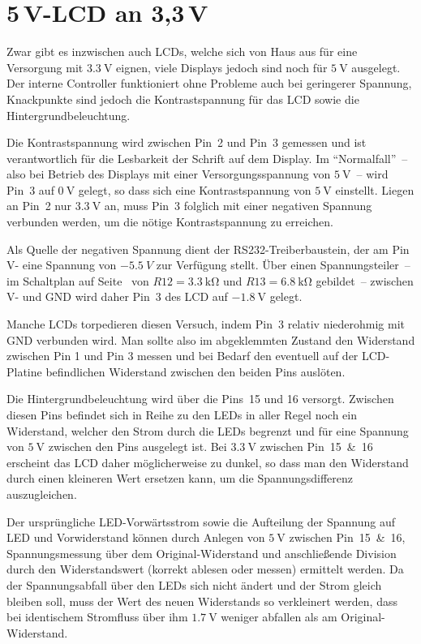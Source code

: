 \documentclass[paper=a4, parskip, numbers=noenddot, toc=listof, headsepline]{scrbook}
\begin{document}
		 \section[5V-LCD an 3,3V]{5\,V-LCD an 3,3\,V}

		  Zwar gibt es inzwischen auch LCDs, welche sich von Haus aus für eine Versorgung mit $\SI{3,3}{\volt}$ eignen, viele Displays jedoch sind noch für $\SI{5}{\volt}$ ausgelegt. Der interne Controller funktioniert ohne Probleme auch bei geringerer Spannung, Knackpunkte sind jedoch die Kontrastspannung für das LCD sowie die Hintergrundbeleuchtung.

		  Die Kontrastspannung wird zwischen Pin~2 und Pin~3 gemessen und ist verantwortlich für die Lesbarkeit der Schrift auf dem Display. Im \enquote{Normalfall}~-- also bei Betrieb des Displays mit einer Versorgungsspannung von $\SI{5}{\volt}$~-- wird Pin~3 auf $\SI{0}{\volt}$ gelegt, so dass sich eine Kontrastspannung von $\SI{5}{\volt}$ einstellt. Liegen an Pin~2 nur $\SI{3,3}{\volt}$ an, muss Pin~3 folglich mit einer negativen Spannung verbunden werden, um die nötige Kontrastspannung zu erreichen.

		  Als Quelle der negativen Spannung dient der RS232-Treiberbaustein, der am Pin V- eine Spannung von $\SI{-5,5}{V}$ zur Verfügung stellt. Über einen Spannungsteiler~-- im Schaltplan auf Seite~\pageref{fig:transmitterschematic} von $R12 = \SI{3,3}{\kilo\ohm}$ und $R13 = \SI{6,8}{\kilo\ohm}$ gebildet~-- zwischen V- und GND wird daher Pin~3 des LCD auf $\SI{-1,8}{\volt}$ gelegt.

		  Manche LCDs torpedieren diesen Versuch, indem Pin~3 relativ niederohmig mit GND verbunden wird. Man sollte also im abgeklemmten Zustand den Widerstand zwischen Pin 1 und Pin 3 messen und bei Bedarf den eventuell auf der LCD-Platine befindlichen Widerstand zwischen den beiden Pins auslöten.

		  Die Hintergrundbeleuchtung wird über die Pins~15 und 16 versorgt. Zwischen diesen Pins befindet sich in Reihe zu den LEDs in aller Regel noch ein Widerstand, welcher den Strom durch die LEDs begrenzt und für eine Spannung von $\SI{5}{\volt}$ zwischen den Pins ausgelegt ist. Bei $\SI{3,3}{\volt}$ zwischen Pin~15~\&~16 erscheint das LCD daher möglicherweise zu dunkel, so dass man den Widerstand durch einen kleineren Wert ersetzen kann, um die Spannungsdifferenz auszugleichen.

		  Der ursprüngliche LED-Vorwärtsstrom sowie die Aufteilung der Spannung auf LED und Vorwiderstand können durch Anlegen von $\SI{5}{\volt}$ zwischen Pin~15~\&~16, Spannungsmessung über dem Original-Widerstand und anschließende Division durch den Widerstandswert (korrekt ablesen oder messen) ermittelt werden. Da der Spannungsabfall über den LEDs sich nicht ändert und der Strom gleich bleiben soll, muss der Wert des neuen Widerstands so verkleinert werden, dass bei identischem Stromfluss über ihm $\SI{1,7}{\volt}$ weniger abfallen als am Original-Widerstand.
\end{document}
